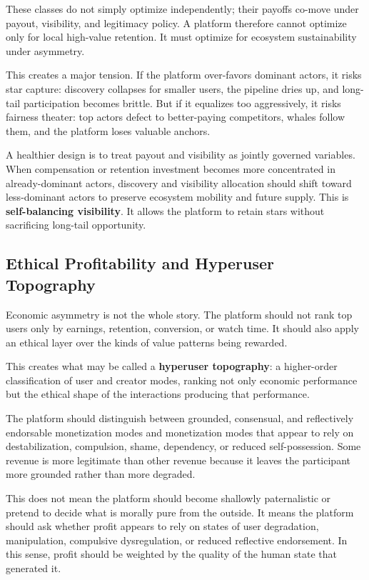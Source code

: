 \documentclass[11pt]{article}
\begin{document}
These classes do not simply optimize independently; their payoffs co-move under payout, visibility, and legitimacy policy. A platform therefore cannot optimize only for local high-value retention. It must optimize for ecosystem sustainability under asymmetry.

This creates a major tension. If the platform over-favors dominant actors, it risks star capture: discovery collapses for smaller users, the pipeline dries up, and long-tail participation becomes brittle. But if it equalizes too aggressively, it risks fairness theater: top actors defect to better-paying competitors, whales follow them, and the platform loses valuable anchors.

A healthier design is to treat payout and visibility as jointly governed variables. When compensation or retention investment becomes more concentrated in already-dominant actors, discovery and visibility allocation should shift toward less-dominant actors to preserve ecosystem mobility and future supply. This is \textbf{self-balancing visibility}. It allows the platform to retain stars without sacrificing long-tail opportunity.

\subsection{Ethical Profitability and Hyperuser Topography}

Economic asymmetry is not the whole story. The platform should not rank top users only by earnings, retention, conversion, or watch time. It should also apply an ethical layer over the kinds of value patterns being rewarded.

This creates what may be called a \textbf{hyperuser topography}: a higher-order classification of user and creator modes, ranking not only economic performance but the ethical shape of the interactions producing that performance.

The platform should distinguish between grounded, consensual, and reflectively endorsable monetization modes and monetization modes that appear to rely on destabilization, compulsion, shame, dependency, or reduced self-possession. Some revenue is more legitimate than other revenue because it leaves the participant more grounded rather than more degraded.

This does not mean the platform should become shallowly paternalistic or pretend to decide what is morally pure from the outside. It means the platform should ask whether profit appears to rely on states of user degradation, manipulation, compulsive dysregulation, or reduced reflective endorsement. In this sense, profit should be weighted by the quality of the human state that generated it.
\end{document}
